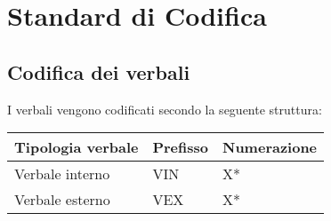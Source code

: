 \chapter{Standard di Codifica}

\section{Codifica dei verbali}
I verbali vengono codificati secondo la seguente struttura:

\begin{center}
    \begin{tabularx}{\linewidth}{l | l | X}            
        \textbf{Tipologia verbale} & \textbf{Prefisso} & \textbf{Numerazione}\\
        \hline
        Verbale interno & VIN & X* \\
        Verbale esterno & VEX & X* \\
    \end{tabularx}
\end{center}